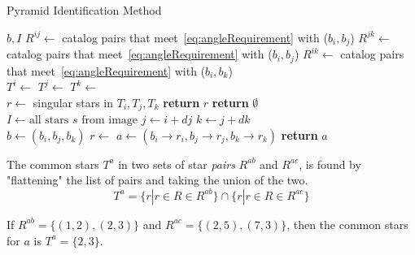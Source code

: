 \begin{algorithm}
    \caption{Pyramid Identification Method} \label{algorithm:pyramidIdentification}
    \begin{algorithmic}[1]
         {$b, I$}
        \State $R^{ij} \gets$ catalog pairs that meet~\eqref{eq:angleRequirement} with ($b_i, b_j$)
        \State $R^{jk} \gets$ catalog pairs that meet~\eqref{eq:angleRequirement} with ($b_i, b_j$)
        \State $R^{ik} \gets$ catalog pairs that meet~\eqref{eq:angleRequirement} with ($b_i, b_k$)
        \\
        \State $T^i \gets $ 
        \State $T^j \gets $ 
        \State $T^k \gets $ 
        \\
        \State $r \gets $ singular stars in $T_i, T_j, T_k$
        \State \textbf{return} $r$
        \EndIf
        \EndIf
        \State \textbf{return} $\emptyset$
        \EndFunction
        \\
        \State $I \gets \text{all stars } s \text{ from image}$
        \State $j \gets i + dj$
        \State $k \gets j + dk$
        \\
        \State $b \gets (b_i, b_j, b_k)$
        \State $r \gets$ 
        \State $a \gets (b_i \rightarrow r_i, b_j \rightarrow r_j, b_k \rightarrow r_k)$
        \State \textbf{return} $a$
        \EndIf
        \EndFor
        \EndFor
        \EndFor
        \EndProcedure
    \end{algorithmic}
\end{algorithm}

The common stars $T^a$ in two sets of star \textit{pairs} $R^{ab}$ and $R^{ac}$, is found by "flattening" the list of
pairs and taking the union of the two.
\begin{equation}
    \label{eq:commonStarsPyramid}
    T^a = \{ r | r \in R \in R^{ab} \} \cap \{ r | r \in R \in R^{ac} \}
\end{equation}

If $R^{ab} = \{ (1, 2), (2, 3) \}$ and $R^{ac} = \{ (2, 5), (7, 3) \}$, then the common stars for $a$ is
$T^a = \{2, 3\}$.

